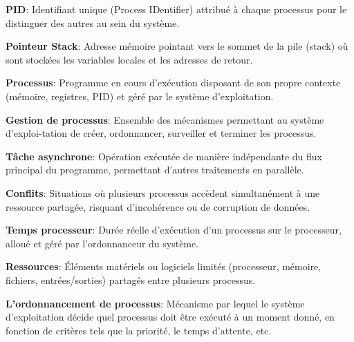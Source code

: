 \vspace{0.5cm}

\noindent \textbf{PID}: Identifiant unique (Process IDentifier) attribué à chaque processus pour le distinguer des autres au sein du système.

\vspace{0.5cm}

\noindent \textbf{Pointeur Stack}: Adresse mémoire pointant vers le sommet de la pile (stack) où sont stockées les variables locales et les adresses de retour.

\vspace{0.5cm}

\noindent \textbf{Processus}: Programme en cours d'exécution disposant de son propre contexte (mémoire, registres, PID) et géré par le système d'exploitation.

\vspace{0.5cm}

\noindent \textbf{Gestion de processus}: Ensemble des mécanismes permettant au système d'exploi-tation de créer, ordonnancer, surveiller et terminer les processus.

\vspace{0.5cm}

\noindent \textbf{Tâche asynchrone}: Opération exécutée de manière indépendante du flux principal du programme, permettant d'autres traitements en parallèle.

\vspace{0.5cm}

\noindent \textbf{Conflits}: Situations où plusieurs processus accèdent simultanément à une ressource partagée, risquant d'incohérence ou de corruption de données.

\vspace{0.5cm}

\noindent \textbf{Temps processeur}: Durée réelle d'exécution d'un processus sur le processeur, alloué et géré par l'ordonnanceur du système.

\vspace{0.5cm}

\noindent \textbf{Ressources}: Éléments matériels ou logiciels limités (processeur, mémoire, fichiers, entrées/sorties) partagés entre plusieurs processus.

\vspace{0.5cm}

\noindent \textbf{L'ordonnancement de processus}: Mécanisme par lequel le système d'exploitation décide quel processus doit être exécuté à un moment donné, en fonction de critères tels que la priorité, le temps d'attente, etc.


